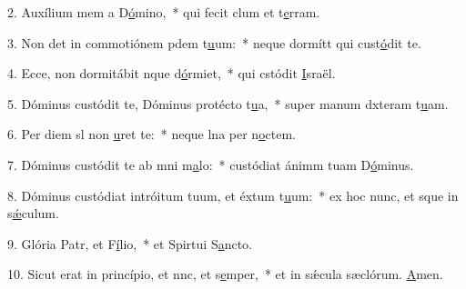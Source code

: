 2. Auxílium mem a D\uline{ó}mino,~* qui fecit clum et t\uline{e}rram.\par 
3. Non det in commotiónem pdem t\uline{u}um:~* neque dormítt qui cust\uline{ó}dit te.\par 
4. Ecce, non dormitábit nque d\uline{ó}rmiet,~* qui cstódit \uline{I}sraël.\par 
5. Dóminus custódit te, Dóminus protécto t\uline{u}a,~* super manum dxteram t\uline{u}am.\par 
6. Per diem sl non \uline{u}ret te:~* neque lna per n\uline{o}ctem.\par 
7. Dóminus custódit te ab mni m\uline{a}lo:~* custódiat ánimm tuam D\uline{ó}minus.\par 
8. Dóminus custódiat intróitum tuum, et éxtum t\uline{u}um:~* ex hoc nunc, et sque in s\uline{ǽ}culum.\par 
9. Glória Patr, et F\uline{í}lio,~* et Spirtui S\uline{a}ncto.\par 
10. Sicut erat in princípio, et nnc, et s\uline{e}mper,~* et in sǽcula sæclórum. \uline{A}men.\par 
